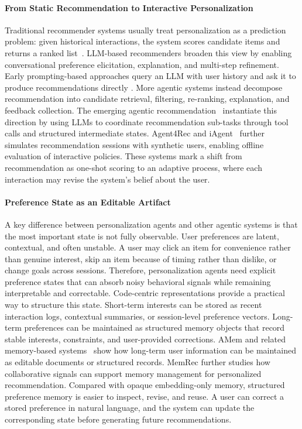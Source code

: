 \paragraph{From Static Recommendation to Interactive Personalization}
Traditional recommender systems usually treat personalization as a prediction problem: given historical interactions, the system scores candidate items and returns a ranked list~\citep{he2020lightgcn,guo2017deepfm}. LLM-based recommenders broaden this view by enabling conversational preference elicitation, explanation, and multi-step refinement. Early prompting-based approaches query an LLM with user history and ask it to produce recommendations directly \citep{hou2024large, dai2023uncovering}. More agentic systems instead decompose recommendation into candidate retrieval, filtering, re-ranking, explanation, and feedback collection.
The emerging agentic recommendation~\citep{liu2025recoworld,wang2024recmind,huang2025recommender} instantiate this direction by using LLMs to coordinate recommendation sub-tasks through tool calls and structured intermediate states. Agent4Rec \citep{zhang2024generative} and iAgent~\cite{xu2025iagent} further simulates recommendation sessions with synthetic users, enabling offline evaluation of interactive policies. These systems mark a shift from recommendation as one-shot scoring to an adaptive process, where each interaction may revise the system's belief about the user.

\paragraph{Preference State as an Editable Artifact}
A key difference between personalization agents and other agentic systems is that the most important state is not fully observable. User preferences are latent, contextual, and often unstable. A user may click an item for convenience rather than genuine interest, skip an item because of timing rather than dislike, or change goals across sessions. Therefore, personalization agents need explicit preference states that can absorb noisy behavioral signals while remaining interpretable and correctable.
Code-centric representations provide a practical way to structure this state. Short-term interests can be stored as recent interaction logs, contextual summaries, or session-level preference vectors. Long-term preferences can be maintained as structured memory objects that record stable interests, constraints, and user-provided corrections. AMem \citep{xu2026mem} and related memory-based systems~\citep{wei2025evo,chhikara2025mem0} show how long-term user information can be maintained as editable documents or structured records. MemRec \citep{chen2026memrec} further studies how collaborative signals can support memory management for personalized recommendation. Compared with opaque embedding-only memory, structured preference memory is easier to inspect, revise, and reuse. A user can correct a stored preference in natural language, and the system can update the corresponding state before generating future recommendations.

